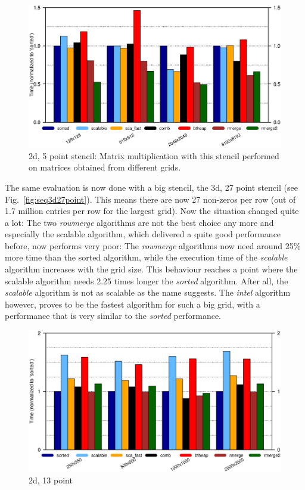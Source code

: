 \begin{figure}[tbp]
	\centering
	\hspace*{-7mm}\includegraphics[width=1.05\textwidth, trim={0 6.9cm 0 1cm},clip]{seq_2d5point}
	\caption{2d, 5 point stencil: Matrix multiplication with this stencil performed on matrices obtained from different grids.} 
	\label{fig:seq2d5point}
\end{figure}

The same evaluation is now done with a big stencil, the 3d, 27 point stencil (see Fig.~\ref{fig:seq3d27point}). This means there are now 27 non-zeros per row (out of 1.7 million entries per row for the largest grid). Now the situation changed quite a lot: The two \textit{rowmerge} algorithms are not the best choice any more and especially the scalable algorithm, which delivered a quite good performance before, now performs very poor: The \textit{rowmerge} algorithms now need around 25\% more time than the sorted algorithm, while the execution time of the \textit{scalable} algorithm increases with the grid size. This behaviour reaches a point where the scalable algorithm needs 2.25 times longer the \textit{sorted} algorithm. After all, the \textit{scalable} algorithm is not as scalable as the name suggests. The \textit{intel} algorithm however, proves to be the fastest algorithm for such a big grid, with a performance that is very similar to the \textit{sorted} performance. 



\begin{figure}[tbp]
	\centering
	\includegraphics[width=1.1\textwidth, trim={0 7.3cm 0 1cm},clip]{seq_2d13point}
	\caption{2d, 13 point} 
	\label{fig:seq2d13point}
\end{figure}

